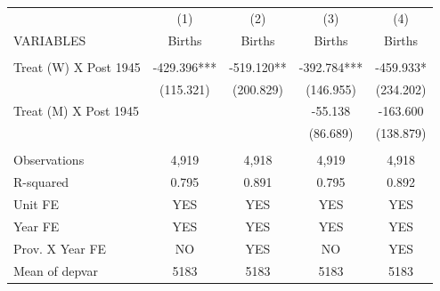 \begin{tabular}{lcccc} \hline
 & (1) & (2) & (3) & (4) \\
VARIABLES & Births & Births & Births & Births \\ \hline
 &  &  &  &  \\
Treat (W) X Post 1945 & -429.396*** & -519.120** & -392.784*** & -459.933* \\
 & (115.321) & (200.829) & (146.955) & (234.202) \\
Treat (M) X Post 1945 &  &  & -55.138 & -163.600 \\
 &  &  & (86.689) & (138.879) \\
 &  &  &  &  \\
Observations & 4,919 & 4,918 & 4,919 & 4,918 \\
R-squared & 0.795 & 0.891 & 0.795 & 0.892 \\
Unit FE & YES & YES & YES & YES \\
Year FE & YES & YES & YES & YES \\
Prov. X Year FE & NO & YES & NO & YES \\
 Mean of depvar & 5183 & 5183 & 5183 & 5183 \\ \hline
\end{tabular}
